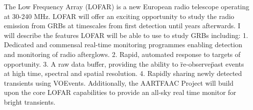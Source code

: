 


\bigskip



\bigskip

\noindent The Low Frequency Array (LOFAR) is a new European radio telescope operating at 30-240 MHz. LOFAR will offer an exciting opportunity to study the radio emission from GRBs at timescales from first detection until years afterwards. I will describe the features LOFAR will be able to use to study GRBs including:
1. Dedicated and commensal real-time monitoring programmes enabling detection and monitoring of radio afterglows.
2. Rapid, automated response to targets of opportunity.
3. A raw data buffer, providing the ability to \"re-observe\" past events at high time, spectral and spatial resolution.
4. Rapidly sharing newly detected transients using VOEvents.
Additionally, the AARTFAAC Project will build upon the core LOFAR capabilities to provide an all-sky real time monitor for bright transients.
